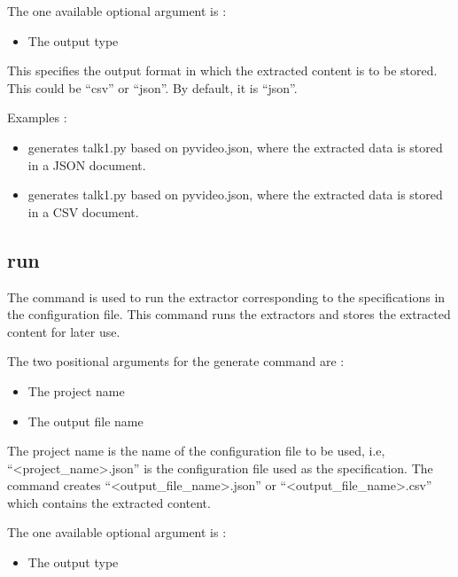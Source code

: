 \documentclass[letterpaper,12pt,english]{sphinxmanual}
\begin{document}
The one available optional argument is :
\begin{itemize}
\item {} 
The output type

\end{itemize}

This specifies the output format in which the extracted content is to be stored. This could be ``csv'' or ``json''. By default, it is ``json''.

Examples :
\begin{itemize}
\item {} 
 generates talk1.py based on pyvideo.json, where the extracted data is stored in a JSON document.

\item {} 
 generates talk1.py based on pyvideo.json, where the extracted data is stored in a CSV document.

\end{itemize}


\subsection{run}
\label{framework/commands:command-run}\label{framework/commands:run}
The  command is used to run the extractor corresponding to the specifications in the configuration file. This command runs the extractors and stores the extracted content for later use.

The two positional arguments for the generate command are :
\begin{itemize}
\item {} 
The project name

\item {} 
The output file name

\end{itemize}

The project name is the name of the configuration file to be used, i.e, ``\textless{}project\_name\textgreater{}.json'' is the configuration file used as the specification. The command creates ``\textless{}output\_file\_name\textgreater{}.json'' or ``\textless{}output\_file\_name\textgreater{}.csv'' which contains the extracted content.

The one available optional argument is :
\begin{itemize}
\item {} 
The output type

\end{itemize}
\end{document}

